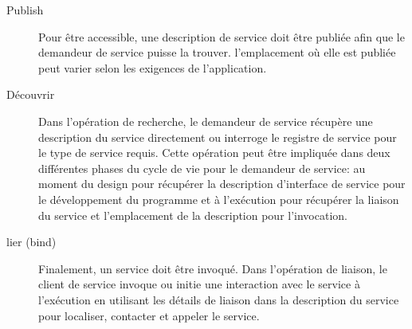     \SpecialItem
    \begin{description}%
    \item[Publish] Pour être accessible, une description de service
      doit être publiée afin que le demandeur de service puisse la
      trouver. l'emplacement où elle est publiée peut varier selon les
      exigences de l'application.

  
    \item[Découvrir]
      Dans l'opération de recherche, le demandeur de service récupère
      une description du service directement ou interroge le registre
      de service pour le type de service requis. Cette opération peut
      être impliquée dans deux différentes phases du cycle de vie pour
      le demandeur de service: au moment du design pour récupérer la
      description d'interface de service pour le développement du
      programme et à l'exécution pour récupérer la liaison du service
      et l'emplacement de la description pour l'invocation.


    \item[lier (bind)] Finalement, un service doit être invoqué. Dans
      l'opération de liaison, le client de service invoque ou initie
      une interaction avec le service à l'exécution en utilisant les
      détails de liaison dans la description du service pour
      localiser, contacter et appeler le service.
      
    \end{description}

